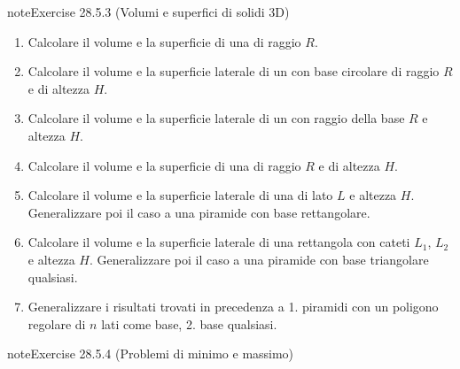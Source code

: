 \documentclass[letterpaper,10pt,italian]{jupyterBook}
\begin{document}
\begin{sphinxadmonition}{note}{Exercise 28.5.3 (Volumi e superfici di solidi \sphinxhyphen{} 3D)}


\begin{enumerate}
%
\item {} 
\sphinxAtStartPar
Calcolare il volume e la superficie di una  di raggio \(R\). 

\item {} 
\sphinxAtStartPar
Calcolare il volume e la superficie laterale di un  con base circolare di raggio \(R\) e di altezza \(H\).

\item {} 
\sphinxAtStartPar
Calcolare il volume e la superficie laterale di un  con raggio della base \(R\) e altezza \(H\).

\item {} 
\sphinxAtStartPar
Calcolare il volume e la superficie di una  di raggio \(R\) e di altezza \(H\).

\item {} 
\sphinxAtStartPar
Calcolare il volume e la superficie laterale di una  di lato \(L\) e altezza \(H\). Generalizzare poi il caso a una piramide con base rettangolare.

\item {} 
\sphinxAtStartPar
Calcolare il volume e la superficie laterale di una  rettangola con cateti \(L_1\), \(L_2\) e altezza \(H\). Generalizzare poi il caso a una piramide con base triangolare qualsiasi.

\item {} 
\sphinxAtStartPar
Generalizzare i risultati trovati in precedenza a 1. piramidi con un poligono regolare di \(n\) lati come base, 2. base qualsiasi.

\end{enumerate}
\end{sphinxadmonition}
 \label{exercise:ch/vector-calculus/problems-exercise-3}

\begin{sphinxadmonition}{note}{Exercise 28.5.4 (Problemi di minimo e massimo)}


\end{sphinxadmonition}
\end{document}
